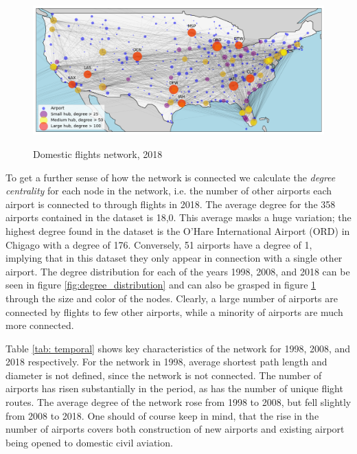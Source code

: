 \begin{figure}[H]
  \centering
  \caption{Domestic flights network, 2018}
    \includegraphics[width=1. \textwidth]{Exam/Figures/map_general_18}
    \vspace{-0.7cm}
  \label{fig:map_general_18}
\end{figure}
\noindent
To get a further sense of how the network is connected we calculate the \textit{degree centrality} for each node in the network, i.e. the number of other airports each airport is connected to through flights in 2018. The average degree for the 358 airports contained in the dataset is 18,0. This average masks a huge variation; the highest degree found in the dataset is the O'Hare International Airport (ORD) in Chigago with a degree of 176.  Conversely, 51 airports have a degree of 1, implying that in this dataset they only appear in connection with a single other airport. 
The degree distribution for each of the years 1998, 2008, and 2018 can be seen in figure \ref{fig:degree_distribution} and can also be grasped in figure \ref{fig:map_general_18} through the size and color of the nodes. Clearly, a large number of airports are connected by flights to few other airports, while a minority of airports are much more connected.
\par
Table \ref{tab: temporal} shows key characteristics of the network for 1998, 2008, and 2018 respectively. For the network in 1998, average shortest path length and diameter is not defined, since the network is not connected. The number of airports has risen substantially in the period, as has the number of unique flight routes. The average degree of the network rose from 1998 to 2008, but fell slightly from 2008 to 2018. One should of course keep in mind, that the rise in the number of airports  covers both construction of new airports and existing airport being opened to domestic civil aviation. %
